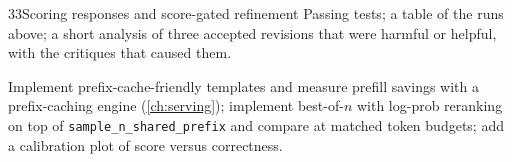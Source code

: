 \begin{labbox}{33}{Scoring responses and score-gated refinement}
Passing tests; a table of the runs above; a short analysis of three accepted revisions that were
harmful or helpful, with the critiques that caused them.

Implement prefix-cache-friendly templates and measure prefill savings with a prefix-caching engine
(\cref{ch:serving}); implement best-of-$n$ with log-prob reranking on top of
\texttt{sample\_n\_shared\_prefix} and compare at matched token budgets; add a calibration plot of
score versus correctness.
\end{labbox}
